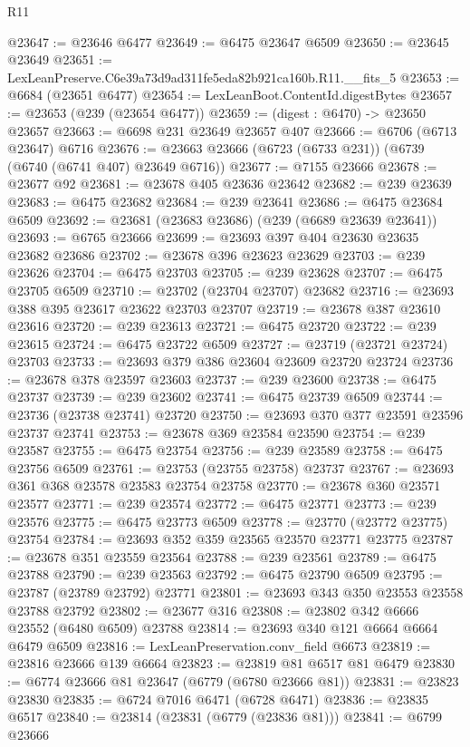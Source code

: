 \begin{lexlean}{R11}
\begin{coremodule}
@23647 := @23646 @6477
@23649 := @6475 @23647 @6509
@23650 := @23645 @23649
@23651 := LexLeanPreserve.C6e39a73d9ad311fe5eda82b921ca160b.R11.__fits_5
@23653 := @6684 (@23651 @6477)
@23654 := LexLeanBoot.ContentId.digestBytes
@23657 := @23653 (@239 (@23654 @6477))
@23659 := (digest : @6470) -> @23650 @23657
@23663 := @6698 @231 @23649 @23657 @407
@23666 := @6706 (@6713 @23647) @6716
@23676 := @23663 @23666 (@6723 (@6733 @231)) (@6739 (@6740 (@6741 @407) @23649 @6716))
@23677 := @7155 @23666
@23678 := @23677 @92
@23681 := @23678 @405 @23636 @23642
@23682 := @239 @23639
@23683 := @6475 @23682
@23684 := @239 @23641
@23686 := @6475 @23684 @6509
@23692 := @23681 (@23683 @23686) (@239 (@6689 @23639 @23641))
@23693 := @6765 @23666
@23699 := @23693 @397 @404 @23630 @23635 @23682 @23686
@23702 := @23678 @396 @23623 @23629
@23703 := @239 @23626
@23704 := @6475 @23703
@23705 := @239 @23628
@23707 := @6475 @23705 @6509
@23710 := @23702 (@23704 @23707) @23682
@23716 := @23693 @388 @395 @23617 @23622 @23703 @23707
@23719 := @23678 @387 @23610 @23616
@23720 := @239 @23613
@23721 := @6475 @23720
@23722 := @239 @23615
@23724 := @6475 @23722 @6509
@23727 := @23719 (@23721 @23724) @23703
@23733 := @23693 @379 @386 @23604 @23609 @23720 @23724
@23736 := @23678 @378 @23597 @23603
@23737 := @239 @23600
@23738 := @6475 @23737
@23739 := @239 @23602
@23741 := @6475 @23739 @6509
@23744 := @23736 (@23738 @23741) @23720
@23750 := @23693 @370 @377 @23591 @23596 @23737 @23741
@23753 := @23678 @369 @23584 @23590
@23754 := @239 @23587
@23755 := @6475 @23754
@23756 := @239 @23589
@23758 := @6475 @23756 @6509
@23761 := @23753 (@23755 @23758) @23737
@23767 := @23693 @361 @368 @23578 @23583 @23754 @23758
@23770 := @23678 @360 @23571 @23577
@23771 := @239 @23574
@23772 := @6475 @23771
@23773 := @239 @23576
@23775 := @6475 @23773 @6509
@23778 := @23770 (@23772 @23775) @23754
@23784 := @23693 @352 @359 @23565 @23570 @23771 @23775
@23787 := @23678 @351 @23559 @23564
@23788 := @239 @23561
@23789 := @6475 @23788
@23790 := @239 @23563
@23792 := @6475 @23790 @6509
@23795 := @23787 (@23789 @23792) @23771
@23801 := @23693 @343 @350 @23553 @23558 @23788 @23792
@23802 := @23677 @316
@23808 := @23802 @342 @6666 @23552 (@6480 @6509) @23788
@23814 := @23693 @340 @121 @6664 @6664 @6479 @6509
@23816 := LexLeanPreservation.conv_field @6673
@23819 := @23816 @23666 @139 @6664
@23823 := @23819 @81 @6517 @81 @6479
@23830 := @6774 @23666 @81 @23647 (@6779 (@6780 @23666 @81))
@23831 := @23823 @23830
@23835 := @6724 @7016 @6471 (@6728 @6471)
@23836 := @23835 @6517
@23840 := @23814 (@23831 (@6779 (@23836 @81)))
@23841 := @6799 @23666

\end{coremodule}
\end{lexlean}
